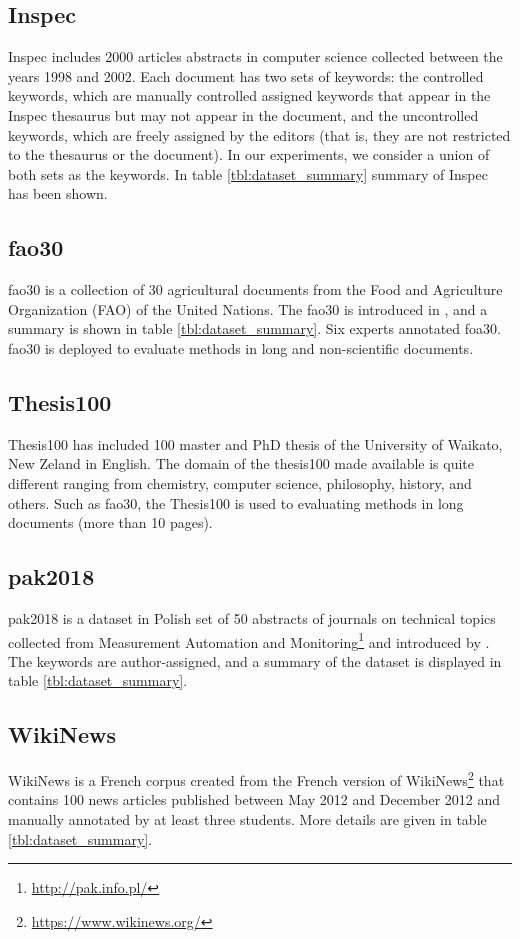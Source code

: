 \documentclass[3p]{elsarticle}
\begin{document}
\subsection*{Inspec}
Inspec \cite{Hulth2003} includes 2000 articles abstracts in computer science collected between the years 1998 and 2002. Each document has two sets of keywords: the controlled keywords, which are manually controlled assigned keywords that appear in the Inspec thesaurus but may not appear in the document, and the uncontrolled keywords, which are freely assigned by the editors (that is, they are not restricted to the thesaurus or the document). In our experiments, we consider a union of both sets as the keywords. In table \ref{tbl:dataset_summary} summary of Inspec has been shown.

\subsection*{fao30}
fao30 is a collection of 30 agricultural documents from the Food and Agriculture Organization (FAO) of the United Nations. The fao30 is introduced in \cite{Medelyan2006}, and a summary is shown in table \ref{tbl:dataset_summary}. Six experts annotated foa30. fao30 is deployed to evaluate methods in long and non-scientific documents.

\subsection*{Thesis100}
Thesis100 \cite{medelyan_2015} has included 100 master and PhD thesis of the University of Waikato, New Zeland in English. The domain of the thesis100 made available is quite different ranging from chemistry, computer science, philosophy, history, and others. Such as fao30, the Thesis100 is used to evaluating methods in long documents (more than 10 pages).

\subsection*{pak2018}
pak2018 is a dataset in Polish set of 50 abstracts of journals on technical topics collected from Measurement Automation and Monitoring\footnote{\url{http://pak.info.pl/}} and introduced by \citet{Campos2020}. The keywords are author-assigned, and a summary of the dataset is displayed in table \ref{tbl:dataset_summary}.

\subsection*{WikiNews}
WikiNews \cite{Bougouin2013} is a French corpus created from the French version of WikiNews\footnote{\url{https://www.wikinews.org/}} that contains 100 news articles published between May 2012 and December 2012 and manually annotated by at least three students. More details are given in table \ref{tbl:dataset_summary}.
\end{document}
